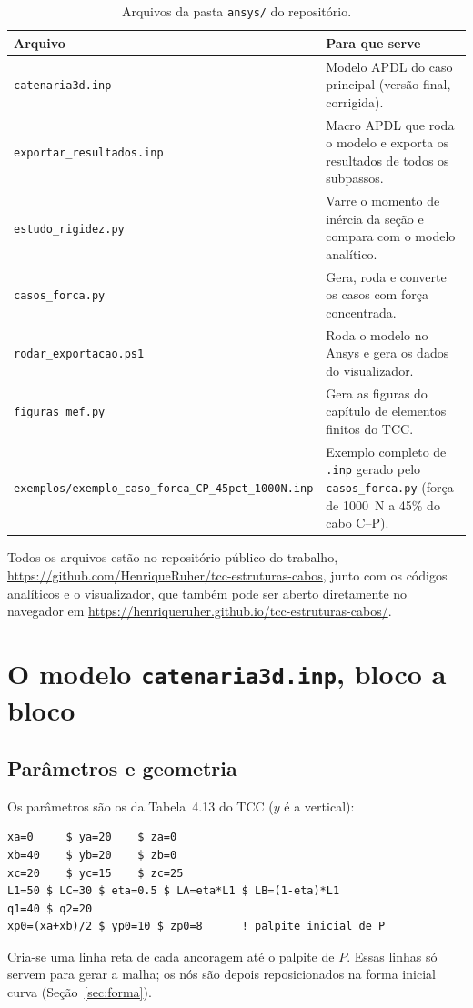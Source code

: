\documentclass[11pt,a4paper]{article}
\begin{document}
\begin{table}[H]
\centering
\caption{Arquivos da pasta \texttt{ansys/} do repositório.}
\begin{tabular}{p{5.3cm}p{9.7cm}}
\toprule
\textbf{Arquivo} & \textbf{Para que serve} \\
\midrule
\texttt{catenaria3d.inp} & Modelo APDL do caso principal (versão final, corrigida). \\
\texttt{exportar\_resultados.inp} & Macro APDL que roda o modelo e exporta os resultados de todos os subpassos. \\
\texttt{estudo\_rigidez.py} & Varre o momento de inércia da seção e compara com o modelo analítico. \\
\texttt{casos\_forca.py} & Gera, roda e converte os casos com força concentrada. \\
\texttt{rodar\_exportacao.ps1} & Roda o modelo no Ansys e gera os dados do visualizador. \\
\texttt{figuras\_mef.py} & Gera as figuras do capítulo de elementos finitos do TCC. \\
\texttt{exemplos/exemplo\_caso\_forca\_CP\_45pct\_1000N.inp} & Exemplo completo de \texttt{.inp} gerado pelo \texttt{casos\_forca.py} (força de 1000~N a 45\% do cabo C--P). \\
\bottomrule
\end{tabular}
\end{table}

Todos os arquivos estão no repositório público do trabalho,
\url{https://github.com/HenriqueRuher/tcc-estruturas-cabos}, junto com os códigos analíticos e o
visualizador, que também pode ser aberto diretamente no navegador em
\url{https://henriqueruher.github.io/tcc-estruturas-cabos/}.

\section{O modelo \texttt{catenaria3d.inp}, bloco a bloco}

\subsection{Parâmetros e geometria}
Os parâmetros são os da Tabela~4.13 do TCC ($y$ é a vertical):
\begin{lstlisting}[language=APDL]
xa=0     $ ya=20    $ za=0
xb=40    $ yb=20    $ zb=0
xc=20    $ yc=15    $ zc=25
L1=50 $ LC=30 $ eta=0.5 $ LA=eta*L1 $ LB=(1-eta)*L1
q1=40 $ q2=20
xp0=(xa+xb)/2 $ yp0=10 $ zp0=8      ! palpite inicial de P
\end{lstlisting}
Cria-se uma linha reta de cada ancoragem até o palpite de $P$. Essas linhas só servem para gerar a
malha; os nós são depois reposicionados na forma inicial curva (Seção~\ref{sec:forma}).
\end{document}
